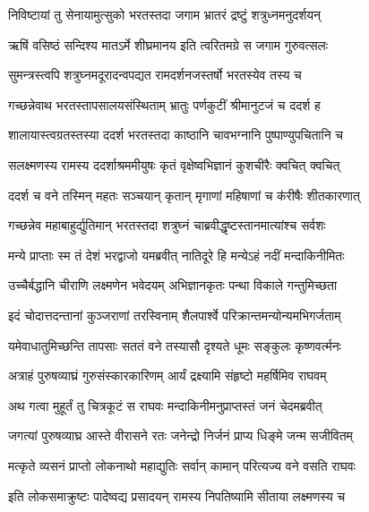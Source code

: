 
\twolineshloka
{निविष्टायां तु सेनायामुत्सुको भरतस्तदा}
{जगाम भ्रातरं द्रष्टुं शत्रुध्नमनुदर्शयन्} %

\twolineshloka
{ऋषिं वसिष्ठं सन्दिश्य मातऽर्मे शीघ्रमानय}
{इति त्वरितमग्रे स जगाम गुरुवत्सलः} %

\twolineshloka
{सुमन्त्रस्त्वपि शत्रुघ्नमदूरादन्वपद्यत}
{रामदर्शनजस्तर्षो भरतस्येव तस्य च} %

\twolineshloka
{गच्छन्नेवाथ भरतस्तापसालयसंस्थिताम्}
{भ्रातुः पर्णकुटीं श्रीमानुटजं च ददर्श ह} %

\twolineshloka
{शालायास्त्वग्रतस्तस्या ददर्श भरतस्तदा}
{काष्ठानि चावभग्नानि पुष्पाण्युपचितानि च} %

\twolineshloka
{सलक्ष्मणस्य रामस्य ददर्शाश्रममीयुषः}
{कृतं वृक्षेष्वभिज्ञानं कुशचीरैः क्वचित् क्वचित्} %

\twolineshloka
{ददर्श च वने तस्मिन् महतः सञ्चयान् कृतान्}
{मृगाणां महिषाणां च कऺरीषैः शीतकारणात्} %

\twolineshloka
{गच्छन्नेव महाबाहुर्द्युतिमान् भरतस्तदा}
{शत्रुघ्नं चाब्रवीद्धृष्टस्तानमात्यांश्च सर्वशः} %

\twolineshloka
{मन्ये प्राप्ताः स्म तं देशं भरद्वाजो यमब्रवीत्}
{नातिदूरे हि मन्येऽहं नदीं मन्दाकिनीमितः} %

\twolineshloka
{उच्चैर्बद्धानि चीराणि लक्ष्मणेन भवेदयम्}
{अभिज्ञानकृतः पन्था विकाले गन्तुमिच्छता} %

\twolineshloka
{इदं चोदात्तदन्तानां कुञ्जराणां तरस्विनाम्}
{शैलपार्श्वे परिक्रान्तमन्योन्यमभिगर्जताम्} %

\twolineshloka
{यमेवाधातुमिच्छन्ति तापसाः सततं वने}
{तस्यासौ दृश्यते धूमः सङ्कुलः कृष्णवर्त्मनः} %

\twolineshloka
{अत्राहं पुरुषव्याघ्रं गुरुसंस्कारकारिणम्}
{आर्यं द्रक्ष्यामि संहृष्टो महर्षिमिव राघवम्} %

\twolineshloka
{अथ गत्वा मुहूर्तं तु चित्रकूटं स राघवः}
{मन्दाकिनीमनुप्राप्तस्तं जनं चेदमब्रवीत्} %

\twolineshloka
{जगत्यां पुरुषव्याघ्र आस्ते वीरासने रतः}
{जनेन्द्रो निर्जनं प्राप्य धिङ्मे जन्म सजीवितम्} %

\twolineshloka
{मत्कृते व्यसनं प्राप्तो लोकनाथो महाद्युतिः}
{सर्वान् कामान् परित्यज्य वने वसति राघवः} %

\twolineshloka
{इति लोकसमाक्रुष्टः पादेष्वद्य प्रसादयन्}
{रामस्य निपतिष्यामि सीताया लक्ष्मणस्य च} %

